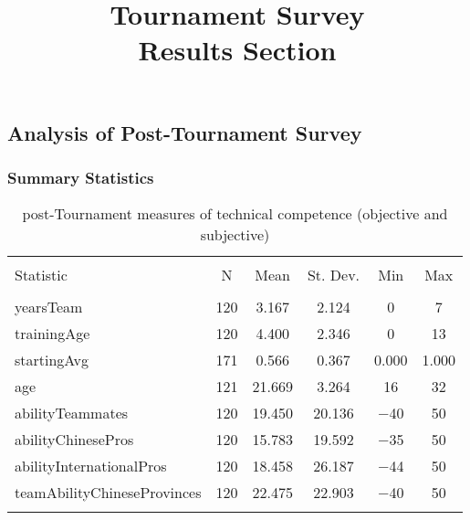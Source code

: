 \documentclass[12pt]{report}
\title{
{Tournament Survey}\\
{Results Section}
}
\begin{document}
\maketitle{}



\subsection{Analysis of Post-Tournament Survey}


\subsubsection{Summary Statistics}
\begin{table}[!htbp] \centering
  \caption{post-Tournament measures of technical competence (objective and subjective)}
  \label{}
\begin{tabular}{@{\extracolsep{5pt}}lccccc}
\\[-1.8ex]\hline
\hline \\[-1.8ex]
Statistic & \multicolumn{1}{c}{N} & \multicolumn{1}{c}{Mean} & \multicolumn{1}{c}{St. Dev.} & \multicolumn{1}{c}{Min} & \multicolumn{1}{c}{Max} \\
\hline \\[-1.8ex]
yearsTeam & 120 & 3.167 & 2.124 & 0 & 7 \\
trainingAge & 120 & 4.400 & 2.346 & 0 & 13 \\
startingAvg & 171 & 0.566 & 0.367 & 0.000 & 1.000 \\
age & 121 & 21.669 & 3.264 & 16 & 32 \\
abilityTeammates & 120 & 19.450 & 20.136 & $-$40 & 50 \\
abilityChinesePros & 120 & 15.783 & 19.592 & $-$35 & 50 \\
abilityInternationalPros & 120 & 18.458 & 26.187 & $-$44 & 50 \\
teamAbilityChineseProvinces & 120 & 22.475 & 22.903 & $-$40 & 50 \\
\hline \\[-1.8ex]
\end{tabular}
\end{table}
\end{document}
